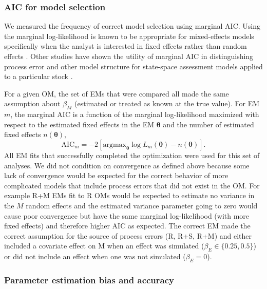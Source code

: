 \documentclass[
  12pt,
]{article}
\begin{document}
\subsubsection*{AIC for model selection}\label{aic-for-model-selection}

We measured the frequency of correct model selection using marginal AIC. Using the marginal log-likelihood is known to be appropriate for mixed-effects models specifically when the analyst is interested in fixed effects rather than random effects \citep{vaidablanchard05}. Other studies have shown the utility of marginal AIC in distinguishing process error and other model structure for state-space assessment models applied to a particular stock \citep{millerhyun18, stockmiller21}.

For a given OM, the set of EMs that were compared all made the same assumption about \(\beta_M\) (estimated or treated as known at the true value). For EM \(m\), the marginal AIC is a function of the marginal log-likelihood maximized with respect to the estimated fixed effects in the EM \(\boldsymbol{\theta}\) and the number of estimated fixed effects \(n\left(\boldsymbol{\theta}\right)\),
\[
\text{AIC}_m = -2\left[{\text{argmax}}_{\boldsymbol{\theta}} \log L_m\left({\boldsymbol{\theta}}\right) - n\left({\boldsymbol{\theta}}\right)\right].
\]
All EM fits that successfully completed the optimization were used for this set of analyses. We did not condition on convergence as defined above because some lack of convergence would be expected for the correct behavior of more complicated models that include process errors that did not exist in the OM. For example R+M EMs fit to R OMs would be expected to estimate no variance in the \(M\) random effects and the estimated variance parameter going to zero would cause poor convergence but have the same marginal log-likelihood (with more fixed effects) and therefore higher AIC as expected. The correct EM made the correct assumption for the source of process errors (R, R+S, R+M) and either included a covariate effect on M when an effect was simulated (\(\beta_E \in \{0.25,0.5\}\)) or did not include an effect when one was not simulated (\(\beta_E = 0\)).

\subsubsection*{Parameter estimation bias and accuracy}\label{parameter-estimation-bias-and-accuracy}
\end{document}
